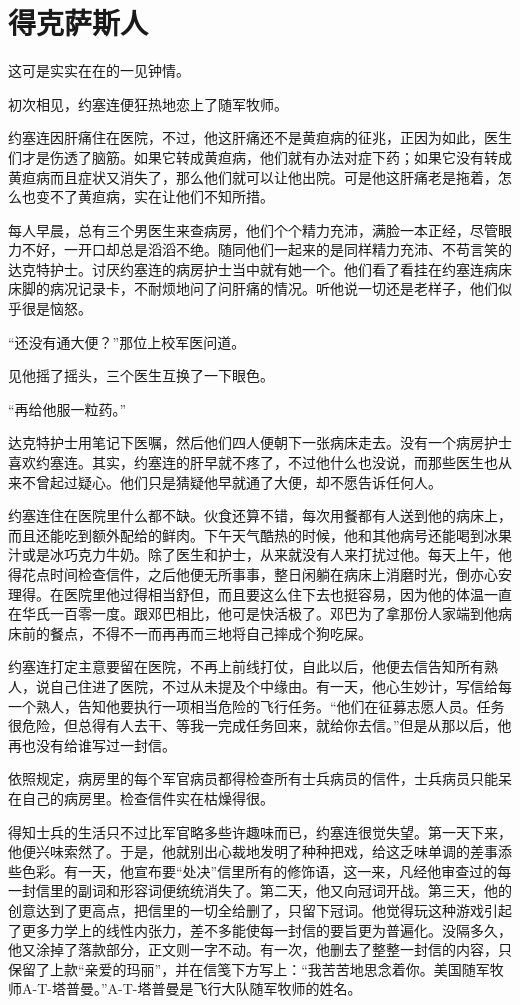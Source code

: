 \chapter{得克萨斯人}
 
这可是实实在在的一见钟情。

初次相见，约塞连便狂热地恋上了随军牧师。

约塞连因肝痛住在医院，不过，他这肝痛还不是黄疸病的征兆，正因为如此，医生们才是伤透了脑筋。如果它转成黄疸病，他们就有办法对症下药；如果它没有转成黄疸病而且症状又消失了，那么他们就可以让他出院。可是他这肝痛老是拖着，怎么也变不了黄疸病，实在让他们不知所措。

每人早晨，总有三个男医生来查病房，他们个个精力充沛，满脸一本正经，尽管眼力不好，一开口却总是滔滔不绝。随同他们一起来的是同样精力充沛、不苟言笑的达克特护士。讨厌约塞连的病房护士当中就有她一个。他们看了看挂在约塞连病床床脚的病况记录卡，不耐烦地问了问肝痛的情况。听他说一切还是老样子，他们似乎很是恼怒。

“还没有通大便？”那位上校军医问道。

见他摇了摇头，三个医生互换了一下眼色。

“再给他服一粒药。”

达克特护士用笔记下医嘱，然后他们四人便朝下一张病床走去。没有一个病房护士喜欢约塞连。其实，约塞连的肝早就不疼了，不过他什么也没说，而那些医生也从来不曾起过疑心。他们只是猜疑他早就通了大便，却不愿告诉任何人。

约塞连住在医院里什么都不缺。伙食还算不错，每次用餐都有人送到他的病床上，而且还能吃到额外配给的鲜肉。下午天气酷热的时候，他和其他病号还能喝到冰果汁或是冰巧克力牛奶。除了医生和护士，从来就没有人来打扰过他。每天上午，他得花点时间检查信件，之后他便无所事事，整日闲躺在病床上消磨时光，倒亦心安理得。在医院里他过得相当舒但，而且要这么住下去也挺容易，因为他的体温一直在华氏一百零一度。跟邓巴相比，他可是快活极了。邓巴为了拿那份人家端到他病床前的餐点，不得不一而再再而三地将自己摔成个狗吃屎。




约塞连打定主意要留在医院，不再上前线打仗，自此以后，他便去信告知所有熟人，说自己住进了医院，不过从未提及个中缘由。有一天，他心生妙计，写信给每一个熟人，告知他要执行一项相当危险的飞行任务。“他们在征募志愿人员。任务很危险，但总得有人去干、等我一完成任务回来，就给你去信。”但是从那以后，他再也没有给谁写过一封信。

依照规定，病房里的每个军官病员都得检查所有士兵病员的信件，士兵病员只能呆在自己的病房里。检查信件实在枯燥得很。

得知士兵的生活只不过比军官略多些许趣味而已，约塞连很觉失望。第一天下来，他便兴味索然了。于是，他就别出心裁地发明了种种把戏，给这乏味单调的差事添些色彩。有一天，他宣布要“处决”信里所有的修饰语，这一来，凡经他审查过的每一封信里的副词和形容词便统统消失了。第二天，他又向冠词开战。第三天，他的创意达到了更高点，把信里的一切全给删了，只留下冠词。他觉得玩这种游戏引起了更多力学上的线性内张力，差不多能使每一封信的要旨更为普遍化。没隔多久，他又涂掉了落款部分，正文则一字不动。有一次，他删去了整整一封信的内容，只保留了上款“亲爱的玛丽”，并在信笺下方写上：“我苦苦地思念着你。美国随军牧师A-T-塔普曼。”A-T-塔普曼是飞行大队随军牧师的姓名。

